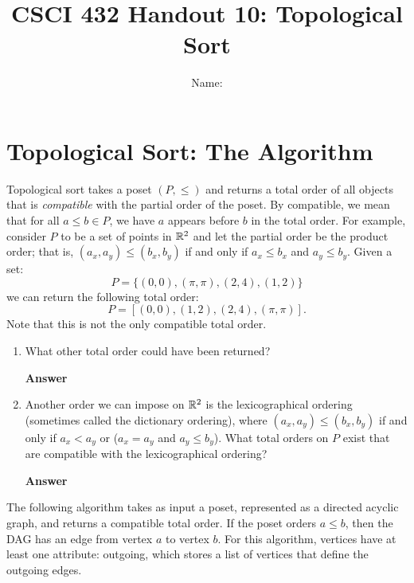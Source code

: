 \documentclass{article}
\title{CSCI 432 Handout 10: Topological Sort}
\author{Name: \rule{3in}{0.15mm}}
\begin{document}
\maketitle

\section*{Topological Sort: The Algorithm}

Topological sort takes a poset $(P,\leq)$ and returns a total order of all
objects that is \emph{compatible} with the partial order of the poset.  By
compatible, we mean that for all $a \leq b \in P$, we have $a$ appears before
$b$ in the total order.  For example, consider $P$ to be a set of points in
${\mathbb R}^2$ and let the partial order be the product order; that is, $(a_x,a_y) \leq
(b_x,b_y)$ if and only if $a_x \leq b_x$ and $a_y \leq b_y$.  Given a set:
$$ P = \{ (0,0), (\pi, \pi), (2,4), (1,2) \}$$
we can return the following total order:
$$P = [ (0,0), (1,2), (2,4), (\pi, \pi)].$$
Note that this is not the only compatible total order.

\begin{enumerate}
    \item What other total order
        could have been returned?

    \textbf{Answer}
    \vspace{1in}

    \item Another order we can impose on ${\mathbb R}^2$ is the lexicographical ordering (sometimes
        called the dictionary ordering), where
        $(a_x,a_y) \leq (b_x,b_y)$ if and only if $a_x < a_y$ or ($a_x=a_y$ and $a_y
        \leq b_y$).  What total orders on $P$ exist that are compatible with the
        lexicographical ordering?

    \textbf{Answer}
\end{enumerate}

\newpage
The following algorithm takes as input a poset, represented as a directed
acyclic graph, and returns a compatible total order.  If the poset orders $a
\leq b$, then the DAG has an edge from vertex $a$ to vertex $b$.  For this
algorithm, vertices have at least one attribute: outgoing, which stores a list
of vertices that define the outgoing edges.
\end{document}
